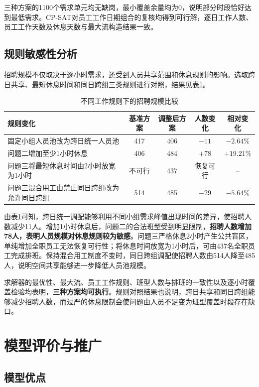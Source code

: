 \documentclass[withoutpreface,bwprint]{cumcmthesis}
\begin{document}
三种方案的1100个需求单元均无缺岗，最小覆盖余量均为0，说明部分时段恰好达到最低需求。CP-SAT对员工工作日期组合的复核均得到可行解，逐日工作人数、员工工作天数及休息天数与最大流构造结果一致。

\subsection{规则敏感性分析}

招聘规模不仅取决于逐小时需求，还受到人员共享范围和休息规则的影响。选取跨日共享、最短休息时间和同日跨组三类规则进行对照，结果见表\ref{tab:rule-sensitivity}。

\begin{table}[H]
\centering
\caption{不同工作规则下的招聘规模比较}
\label{tab:rule-sensitivity}
\begin{tabular}{p{5.2cm}cccc}
\toprule
规则变化 & 基准方案 & 调整后方案 & 人数变化 & 相对变化\\
\midrule
固定小组人员池改为跨日统一人员池
& 417 & 406 & $-11$ & $-2.64\%$\\
问题二增加至少1小时休息
& 406 & 484 & $+78$ & $+19.21\%$\\
问题三将最短休息时间由2小时放宽为1小时
& 不可行 & 437 & 恢复可行 & --\\
问题三混合用工由禁止同日跨组改为允许同日跨组
& 514 & 485 & $-29$ & $-5.64\%$\\
\bottomrule
\end{tabular}
\end{table}

由表\ref{tab:rule-sensitivity}可知，跨日统一调配能够利用不同小组需求峰值出现时间的差异，使招聘人数减少11人。增加1小时休息后，问题二的合法班型受到明显限制，\textbf{招聘人数增加78人，表明人员规模对休息规则较为敏感}。问题三严格休息2小时产生公共盲区，单纯增加全职员工无法恢复可行性；将休息时间放宽为1小时后，可由437名全职员工完成排班。保持混合用工制度不变时，同日跨组调配使招聘人数由514人降至485人，说明空间共享能够进一步降低人员池规模。

求解器的最优性、最大流、员工工作规则、班型人数与排班的一致性以及逐小时覆盖检验均表明，\textbf{三种方案均可执行}。规则对照结果也说明，跨日共享和同日跨组能够减少招聘人数，而过严的休息限制会使问题由人员不足变为班型覆盖时段存在缺口。


\section{模型评价与推广}

\subsection{模型优点}
\end{document}
